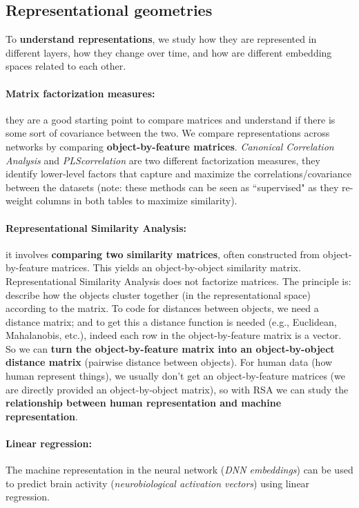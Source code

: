 \subsection{Representational geometries}
To \textbf{understand representations}, we study how they are represented in different layers, how they change over time, and how are different embedding spaces related to each other.

\paragraph{Matrix factorization measures:} they are a good starting point to compare matrices and understand if there is some sort of covariance between the two. We compare representations across networks by comparing \textbf{object-by-feature matrices}. \textit{Canonical Correlation Analysis} and \textit{PLScorrelation} are two different factorization measures, they identify lower-level factors that capture and maximize the correlations/covariance between the datasets (note: these methods can be seen as ``supervised" as they re-weight columns in both tables to maximize similarity).

\paragraph{Representational Similarity Analysis:} it involves \textbf{comparing two similarity matrices}, often constructed from object-by-feature matrices. This yields an object-by-object similarity matrix.
Representational Similarity Analysis does not factorize matrices. The principle is: describe how the objects cluster together (in the representational space) according to the matrix. To code for distances between objects, we need a distance matrix; and to get this a distance function is needed (e.g., Euclidean, Mahalanobis, etc.), indeed each row in the object-by-feature matrix is a vector. So we can \textbf{turn the object-by-feature matrix into an object-by-object distance matrix} (pairwise distance between objects).
For human data (how human represent things), we usually don't get an object-by-feature matrices (we are directly provided an object-by-object matrix), so with RSA we can study the \textbf{relationship between human representation and machine representation}.

\paragraph{Linear regression:} The machine representation in the neural network (\textit{DNN embeddings}) can be used to predict brain activity (\textit{neurobiological activation vectors}) using linear regression.

